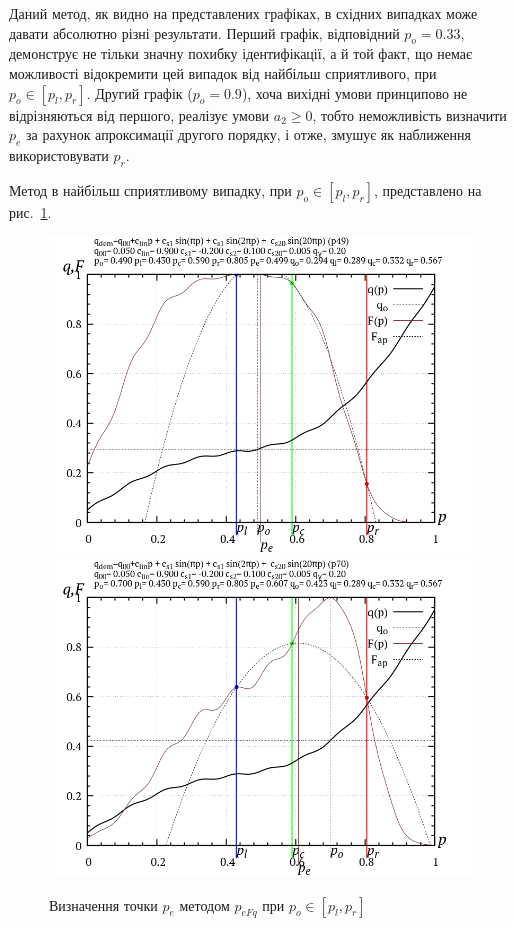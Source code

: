 Даний метод, як видно на представлених графіках, в східних
випадках може давати абсолютно різні результати. Перший графік,
відповідний
$ p_o = 0.33 $, демонструє не тільки значну похибку ідентифікації,
а й той факт, що немає можливості відокремити цей випадок від
найбільш сприятливого, при
$ p_o \in [p_l, p_r] $. Другий графік ($ p_o = 0.9 $),
хоча вихідні умови принципово не відрізняються від
першого, реалізує умови
$ a_2 \ge 0 $, тобто неможливість визначити
$ p_e $ за рахунок апроксимації другого порядку, і отже, змушує як
наближення використовувати
$ p_r $.

Метод в найбільш сприятливому випадку, при
$p_o \in [p_l,p_r]$, представлено на рис.~\ref{atu:f:p_eFq_intra}.


\begin{figure}[htb!]
  \begin{center}
    \includegraphics[width=49\TW]{p/p_eFq/q_p_eFq_p49.png}
    \hfill
    \includegraphics[width=49\TW]{p/p_eFq/q_p_eFq_p70.png}
  \end{center}
\caption{Визначення точки $ p_e $ методом $ p_{eFq} $ при $ p_o \in [p_l, p_r] $}
  \label{atu:f:p_eFq_intra}
\end{figure}

